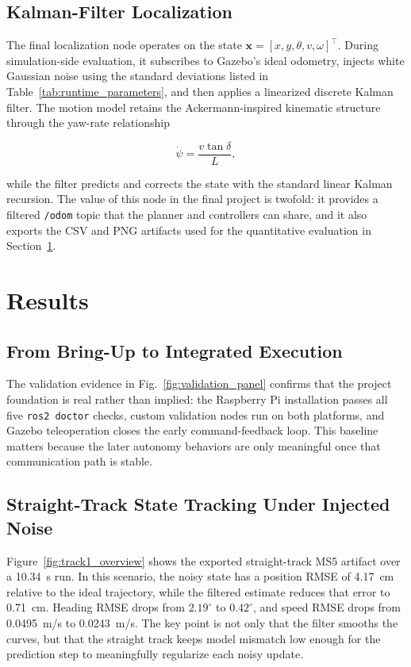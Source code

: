 \documentclass[conference]{IEEEtran}
\begin{document}
\subsection{Kalman-Filter Localization}

The final localization node operates on the state
$\mathbf{x} = [x, y, \theta, v, \omega]^\top$. During simulation-side
evaluation, it subscribes to Gazebo's ideal odometry, injects white Gaussian
noise using the standard deviations listed in
Table~\ref{tab:runtime_parameters}, and then applies a linearized discrete
Kalman filter. The motion model retains the Ackermann-inspired kinematic
structure through the yaw-rate relationship

\begin{equation}
  \dot{\psi} = \frac{v \tan\delta}{L},
  \label{eq:yaw_rate}
\end{equation}

while the filter predicts and corrects the state with the standard linear
Kalman recursion. The value of this node in the final project is twofold: it
provides a filtered \texttt{/odom} topic that the planner and controllers can
share, and it also exports the CSV and PNG artifacts used for the quantitative
evaluation in Section~\ref{sec:results}.

\section{Results}
\label{sec:results}

\subsection{From Bring-Up to Integrated Execution}

The validation evidence in Fig.~\ref{fig:validation_panel} confirms that the
project foundation is real rather than implied: the Raspberry Pi installation
passes all five \texttt{ros2 doctor} checks, custom validation nodes run on both
platforms, and Gazebo teleoperation closes the early command-feedback loop. This
baseline matters because the later autonomy behaviors are only meaningful once
that communication path is stable.

\subsection{Straight-Track State Tracking Under Injected Noise}

Figure~\ref{fig:track1_overview} shows the exported straight-track MS5 artifact
over a 10.34~s run. In this scenario, the noisy state has a position RMSE of
4.17~cm relative to the ideal trajectory, while the filtered estimate reduces
that error to 0.71~cm. Heading RMSE drops from $2.19^{\circ}$ to
$0.42^{\circ}$, and speed RMSE drops from 0.0495~m/s to 0.0243~m/s. The key
point is not only that the filter smooths the curves, but that the straight
track keeps model mismatch low enough for the prediction step to meaningfully
regularize each noisy update.
\end{document}
